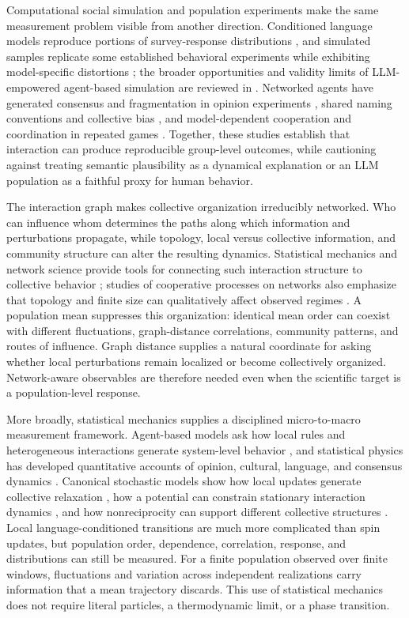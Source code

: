 \documentclass[12pt]{article}
\begin{document}
Computational social simulation and population experiments make the same
measurement problem visible from another direction.  Conditioned language
models reproduce portions of survey-response distributions
\cite{argyle2023}, and simulated samples replicate some established behavioral
experiments while exhibiting model-specific distortions \cite{aher2023}; the
broader opportunities and validity limits of LLM-empowered agent-based
simulation are reviewed in \cite{gao2024abm}.  Networked agents have generated
consensus and fragmentation in opinion experiments \cite{chuang2024}, shared
naming conventions and collective bias \cite{flintashery2025}, and
model-dependent cooperation and coordination in repeated games
\cite{akata2025}.  Together, these studies establish that interaction can
produce reproducible group-level outcomes, while cautioning against treating
semantic plausibility as a dynamical explanation or an LLM population as a
faithful proxy for human behavior.

The interaction graph makes collective organization irreducibly networked.
Who can influence whom determines the paths along which information and
perturbations propagate, while topology, local versus collective information,
and community structure can alter the resulting dynamics.  Statistical
mechanics and network science provide tools for connecting such interaction
structure to collective behavior \cite{albert2002,boccaletti2006}; studies of
cooperative processes on networks also emphasize that topology and finite
size can qualitatively affect observed regimes \cite{dorogovtsev2008}.  A
population mean suppresses this organization: identical mean order can
coexist with different fluctuations, graph-distance correlations, community
patterns, and routes of influence.  Graph distance supplies a natural
coordinate for asking whether local perturbations remain localized or become
collectively organized.  Network-aware observables are therefore
needed even when the scientific target is a population-level response.

More broadly, statistical mechanics supplies a disciplined micro-to-macro
measurement framework.  Agent-based models ask how local rules and
heterogeneous interactions generate system-level behavior
\cite{bonabeau2002}, and statistical physics has developed quantitative
accounts of opinion, cultural, language, and consensus dynamics
\cite{castellano2009,baronchelli2018}.  Canonical stochastic models show how
local updates generate collective relaxation \cite{glauber1963}, how a
potential can constrain stationary interaction dynamics \cite{blume1993}, and
how nonreciprocity can support different collective structures
\cite{fruchart2021}.  Local language-conditioned transitions are much more
complicated than spin updates, but population order, dependence, correlation,
response, and distributions can still be measured.  For a finite population
observed over finite windows, fluctuations and variation across independent
realizations carry information that a mean trajectory discards.  This use of
statistical mechanics does not require literal particles, a thermodynamic
limit, or a phase transition.
\end{document}
